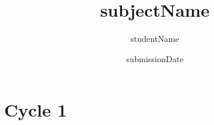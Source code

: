 \documentclass[a4paper,12pt,numbers=noenddot]{scrreprt} %
\title{subjectName}
\author{studentName}
\date{submissionDate}
\begin{document}

\begin{titlepage}
\clearpage
\vspace*{\fill}
\begin{center}
\begin{minipage}{.6\textwidth}
\maketitle
\end{minipage}
\end{center}
\vfill %
\clearpage
\end{titlepage}




\setcounter{tocdepth}{1}
\tableofcontents

\part*{Cycle 1}
\end{document}
